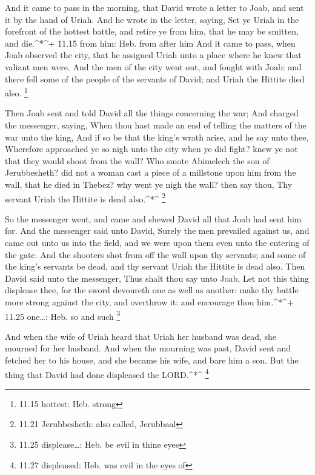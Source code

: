  And it came to pass in the morning, that David wrote a
letter to Joab, and sent it by the hand of Uriah.  And he
wrote in the letter, saying, Set ye Uriah in the forefront of the
hottest battle, and retire ye from him, that he may be smitten, and
die.\^{}*\^{}+ 11.15 from him: Heb. from after him  And it
came to pass, when Joab observed the city, that he assigned Uriah unto a
place where he knew that valiant men were.  And the men of
the city went out, and fought with Joab: and there fell some of the
people of the servants of David; and Uriah the Hittite died also.
\footnote{11.15 hottest: Heb. strong}

 Then Joab sent and told David all the things concerning
the war;  And charged the messenger, saying, When thou hast
made an end of telling the matters of the war unto the king,
 And if so be that the king's wrath arise, and he say unto
thee, Wherefore approached ye so nigh unto the city when ye did fight?
knew ye not that they would shoot from the wall?  Who smote
Abimelech the son of Jerubbesheth? did not a woman cast a piece of a
millstone upon him from the wall, that he died in Thebez? why went ye
nigh the wall? then say thou, Thy servant Uriah the Hittite is dead
also.\^{}*\^{} \footnote{11.21 Jerubbesheth: also called, Jerubbaal}

 So the messenger went, and came and shewed David all that
Joab had sent him for.  And the messenger said unto David,
Surely the men prevailed against us, and came out unto us into the
field, and we were upon them even unto the entering of the gate.
 And the shooters shot from off the wall upon thy servants;
and some of the king's servants be dead, and thy servant Uriah the
Hittite is dead also.  Then David said unto the messenger,
Thus shalt thou say unto Joab, Let not this thing displease thee, for
the sword devoureth one as well as another: make thy battle more strong
against the city, and overthrow it: and encourage thou him.\^{}*\^{}+
11.25 one\ldots: Heb. so and such \footnote{11.25 displease\ldots: Heb.
  be evil in thine eyes}

 And when the wife of Uriah heard that Uriah her husband
was dead, she mourned for her husband.  And when the
mourning was past, David sent and fetched her to his house, and she
became his wife, and bare him a son. But the thing that David had done
displeased the LORD.\^{}*\^{} \footnote{11.27 displeased: Heb. was evil
  in the eyes of}

